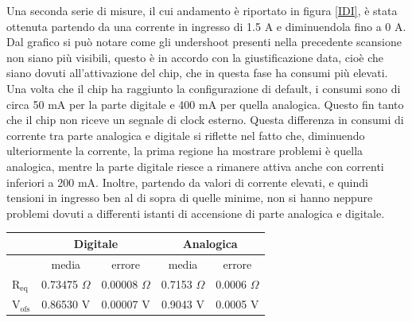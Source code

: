 Una seconda serie di misure, il cui andamento è riportato in figura \ref{IDI}, è stata ottenuta partendo da una corrente in ingresso di 1.5 A e diminuendola fino a 0 A. 
Dal grafico si può notare come gli undershoot presenti nella precedente scansione non siano più visibili, questo è in accordo con la giustificazione data, cioè che siano dovuti all'attivazione del chip, che in questa fase ha consumi più elevati. 
Una volta che il chip ha raggiunto la configurazione di default, i consumi sono di circa 50 mA per la parte digitale e 400 mA per quella analogica. Questo fin tanto che il chip non riceve un segnale di clock esterno. 
Questa differenza in consumi di corrente tra parte analogica e digitale si riflette nel fatto che, diminuendo ulteriormente la corrente, la prima regione ha mostrare problemi è quella analogica, mentre la parte digitale riesce a rimanere attiva anche con correnti inferiori a 200 mA. 
Inoltre, partendo da valori di corrente elevati, e quindi tensioni in ingresso ben al di sopra di quelle minime, non si hanno neppure problemi dovuti a differenti istanti di accensione di parte analogica e digitale.
\begin{center}
\begin{tabular}{|l|c|c|c|c|}
\hline
 & \multicolumn{2}{c|}{Digitale} & \multicolumn{2}{c|}{Analogica} \\ \hline
 
& media & errore & media & errore \\ \hline

$\mathrm{R_{eq}}$ & 0.73475 $\Omega$ & 0.00008 $\Omega$& 0.7153 $\Omega$ & 0.0006 $\Omega$ \\ \hline
$\mathrm{V_{ofs}}$ & 0.86530 V& 0.00007 V & 0.9043 V & 0.0005 V\\ \hline     

\end{tabular}
\end{center}


